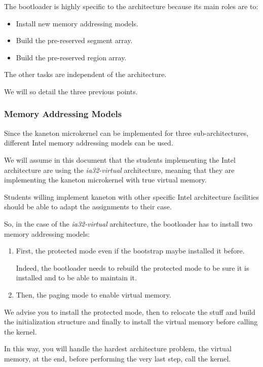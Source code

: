 The bootloader is highly specific to the architecture because its main
roles are to:

\begin{itemize}
  \item
    Install new memory addressing models.
  \item
    Build the pre-reserved segment array.
  \item
    Build the pre-reserved region array.
\end{itemize}

The other tasks are independent of the architecture.

We will so detail the three previous points.

\subsubsection{Memory Addressing Models}

Since the kaneton microkernel can be implemented for three sub-architectures,
different Intel memory addressing models can be used.

We will assume in this document that the students implementing the
Intel architecture are using the \textit{ia32-virtual} architecture, meaning
that they are implementing the kaneton microkernel with true virtual memory.

Students willing implement kaneton with other specific Intel architecture
facilities should be able to adapt the assignments to their case.

So, in the case of the \textit{ia32-virtual} architecture, the bootloader
has to install two memory addressing models:

\begin{enumerate}
  \item
    First, the protected mode even if the bootstrap maybe installed it
    before.

    Indeed, the bootloader needs to rebuild the protected mode to be sure
    it is installed and to be able to maintain it.
  \item
    Then, the paging mode to enable virtual memory.
\end{enumerate}

We advise you to install the protected mode, then to relocate the stuff
and build the initialization structure and finally to install the
virtual memory before calling the kernel.

In this way, you will handle the hardest architecture problem, the virtual
memory, at the end, before performing the very last step, call the kernel.

